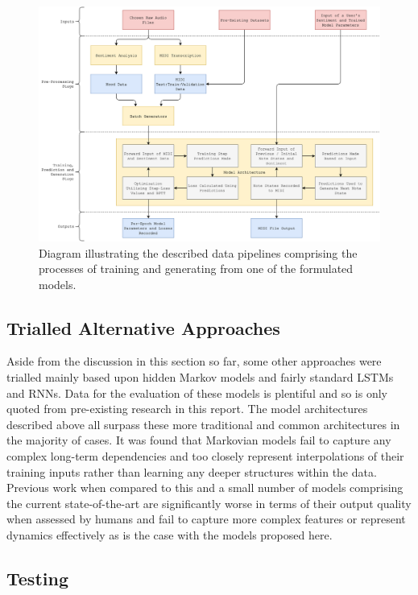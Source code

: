 \documentclass[12pt,]{article}
\begin{document}
\begin{figure}
\centering
\includegraphics{Images/processdiagram.png}
\caption{Diagram illustrating the described data pipelines comprising
the processes of training and generating from one of the formulated
models.}
\end{figure}

\hypertarget{trialled-alternative-approaches}{%
\subsection{Trialled Alternative
Approaches}\label{trialled-alternative-approaches}}

Aside from the discussion in this section so far, some other approaches
were trialled mainly based upon hidden Markov models and fairly standard
LSTMs and RNNs. Data for the evaluation of these models is plentiful and
so is only quoted from pre-existing research in this report. The model
architectures described above all surpass these more traditional and
common architectures in the majority of cases. It was found that
Markovian models fail to capture any complex long-term dependencies and
too closely represent interpolations of their training inputs rather
than learning any deeper structures within the data. Previous work when
compared to this and a small number of models comprising the current
state-of-the-art are significantly worse in terms of their output
quality when assessed by humans and fail to capture more complex
features or represent dynamics effectively as is the case with the
models proposed here.

\hypertarget{testing}{%
\subsection{Testing}\label{testing}}
\end{document}

